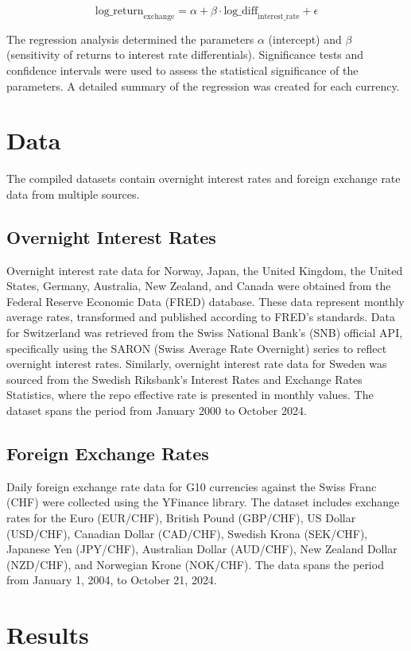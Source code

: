 \documentclass{article}
\begin{document}
\[
\text{log\_return}_{\text{exchange}} = \alpha + \beta \cdot \text{log\_diff}_{\text{interest\_rate}} + \epsilon
\]

The regression analysis determined the parameters \(\alpha\) (intercept) and \(\beta\) (sensitivity of returns to interest rate differentials). Significance tests and confidence intervals were used to assess the statistical significance of the parameters. A detailed summary of the regression was created for each currency.

\section{Data}
The compiled datasets contain overnight interest rates and foreign exchange rate data from multiple sources.

\subsection{Overnight Interest Rates}
Overnight interest rate data for Norway, Japan, the United Kingdom, the United States, Germany, Australia, New Zealand, and Canada were obtained from the Federal Reserve Economic Data (FRED) database. These data represent monthly average rates, transformed and published according to FRED's standards. Data for Switzerland was retrieved from the Swiss National Bank's (SNB) official API, specifically using the SARON (Swiss Average Rate Overnight) series to reflect overnight interest rates. Similarly, overnight interest rate data for Sweden was sourced from the Swedish Riksbank’s Interest Rates and Exchange Rates Statistics, where the repo effective rate is presented in monthly values. The dataset spans the period from January 2000 to October 2024.

\subsection*{Foreign Exchange Rates}
Daily foreign exchange rate data for G10 currencies against the Swiss Franc (CHF) were collected using the YFinance library. The dataset includes exchange rates for the Euro (EUR/CHF), British Pound (GBP/CHF), US Dollar (USD/CHF), Canadian Dollar (CAD/CHF), Swedish Krona (SEK/CHF), Japanese Yen (JPY/CHF), Australian Dollar (AUD/CHF), New Zealand Dollar (NZD/CHF), and Norwegian Krone (NOK/CHF). The data spans the period from January 1, 2004, to October 21, 2024.

\section{Results}
\end{document}
